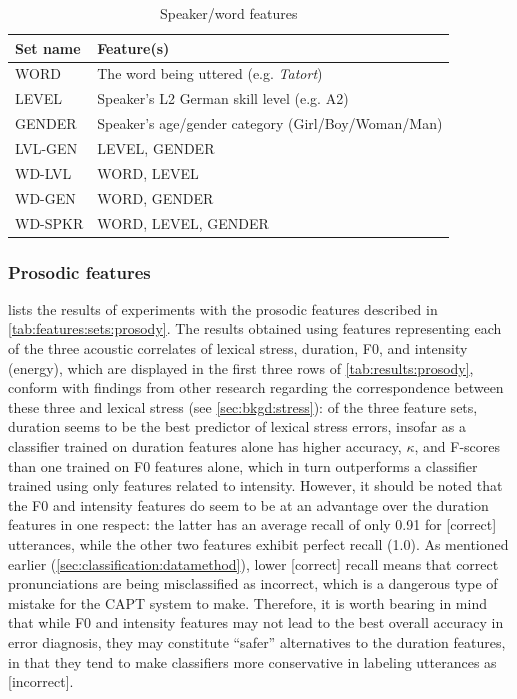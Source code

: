 \begin{table}
			\begin{subtable}[h]{\textwidth}
				\centering
				\caption{Speaker/word features  }
				\begin{tabular}{ll}
				\toprule
				Set name & Feature(s) \\
				\midrule
				WORD & The word being uttered (e.g. \textit{Tatort}) \\
				LEVEL & Speaker's L2 German skill level (e.g. A2)\\
				GENDER & Speaker's age/gender category (Girl/Boy/Woman/Man)\\
				LVL-GEN & LEVEL, GENDER \\
				WD-LVL & WORD, LEVEL \\
				WD-GEN & WORD, GENDER \\
				WD-SPKR & WORD, LEVEL, GENDER \\
				\bottomrule
				\end{tabular}
				\label{tab:features:sets:spkrword}		
			\end{subtable}
				
			\label{tab:features:sets}
		\end{table}
		
		
		\subsubsection{Prosodic features}
		\label{sec:classification:features:prosodic}
		
		 lists the results of experiments with the prosodic features described in \cref{tab:features:sets:prosody}. The results obtained using features representing each of the three acoustic correlates of lexical stress, duration, F0, and intensity (energy), which are displayed in the first three rows of \cref{tab:results:prosody}, conform with findings from other research regarding the correspondence between these three  and lexical stress (see \cref{sec:bkgd:stress}): of the three feature sets, duration seems to be the best predictor of lexical stress errors, insofar as a classifier trained on duration features alone has higher accuracy, $\kappa$, and F-scores than one trained on F0 features alone, which in turn outperforms a classifier trained using only features related to intensity. However, it should be noted that the F0 and intensity features do seem to be at an advantage over the duration features in one respect: the latter has an average recall of only 0.91 for [correct] utterances, while the other two features exhibit perfect recall (1.0). As mentioned earlier (\cref{sec:classification:datamethod}), lower [correct] recall means that correct pronunciations are being misclassified as incorrect, which is a dangerous type of mistake for the CAPT system to make. Therefore, it is worth bearing in mind that while F0 and intensity features may not lead to the best overall accuracy in error diagnosis, they may constitute ``safer'' alternatives to the duration features, in that they tend to make classifiers more conservative in labeling utterances as [incorrect]. 
		

